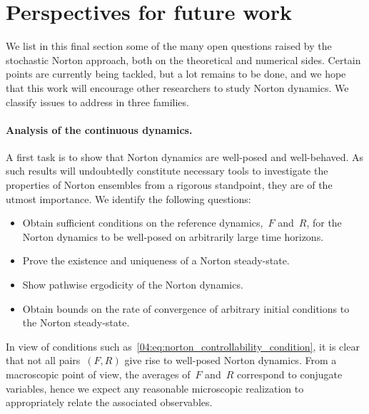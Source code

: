 \section{Perspectives for future work}\label{04:sec:perspective}
We list in this final section some of the many open questions raised by the stochastic Norton approach, both on the theoretical and numerical sides. Certain points are currently being tackled, but a lot remains to be done, and we hope that this work will encourage other researchers to study Norton dynamics. We classify issues to address in three families.

\paragraph{Analysis of the continuous dynamics.}
A first task is to show that Norton dynamics are well-posed and well-behaved. As such results will undoubtedly constitute necessary tools to investigate the properties of Norton ensembles from a rigorous standpoint, they are of the utmost importance. We identify the following questions:
\begin{itemize}
    \item Obtain sufficient conditions on the reference dynamics,~$F$ and~$R$, for the Norton dynamics to be well-posed on arbitrarily large time horizons. 
    \item Prove the existence and uniqueness of a Norton steady-state.
    \item Show pathwise ergodicity of the Norton dynamics.
    \item Obtain bounds on the rate of convergence of arbitrary initial conditions to the Norton steady-state.
\end{itemize}
In view of conditions such as~\eqref{04:eq:norton_controllability_condition}, it is clear that not all pairs~$(F,R)$ give rise to well-posed Norton dynamics. From a macroscopic point of view, the averages of~$F$ and~$R$ correspond to conjugate variables, hence we expect any reasonable microscopic realization to appropriately relate the associated observables.
